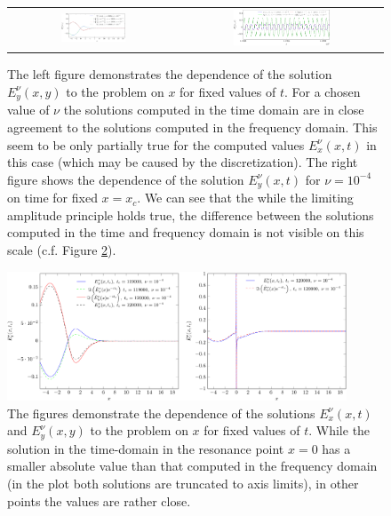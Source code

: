 \begin{figure}
\begin{tabular}{cc}
\includegraphics[width=0.4\textwidth]{pics_time_domain/res/ey_fixed_t_1e3-crop.pdf}&
\includegraphics[width=0.5\textwidth]{pics_time_domain/res/ey_fixed_x_nu1e4-crop.pdf}
\end{tabular}
\caption{The left figure demonstrates the dependence of the solution  
$E_y^{\nu}(x,y)$ to the problem  on $x$ for fixed values of $t$. 
For a chosen value of $\nu$ the solutions computed in the time domain are in close agreement 
to the solutions computed in the frequency domain. This seem to be only partially 
true for the computed values $E_x^{\nu}(x,t)$ in this case (which may be caused by the discretization). 
The right figure shows the dependence of the solution $E_y^{\nu}(x,t)$  for $\nu=10^{-4}$ on time for fixed $x=x_c$. 
We can see that the while the limiting amplitude principle holds true, the difference between the solutions computed in 
the time and frequency domain is not visible on this scale (c.f. Figure \ref{fig:resonance_nus_eyx_t}). 
}
\label{fig:resonance_nus_ey_t}
\end{figure}

\begin{figure}
\includegraphics[width=0.9\textwidth]{pics_time_domain/res/ex_fixed_t_1e4_2-crop.pdf}
\caption{The figures demonstrate the dependence of the solutions 
$E_x^{\nu}(x,t)$ and $E_y^{\nu}(x,y)$ to the problem  on $x$ for fixed values of $t$. While the solution in the time-domain 
in the resonance point $x=0$ has a smaller absolute value than that computed in the frequency domain (in the plot both solutions are truncated to 
axis limits), in other points the values are rather close. }
\label{fig:resonance_nus_eyx_t}
\end{figure}

